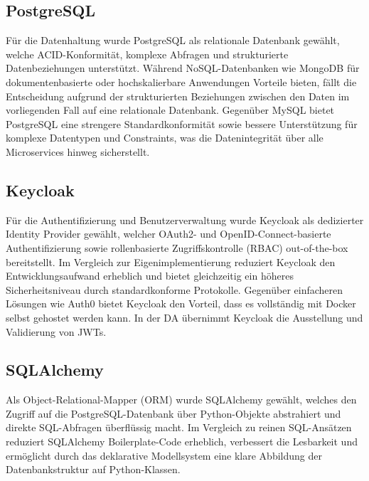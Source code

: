 \newpage

\subsection{PostgreSQL}

Für die Datenhaltung wurde PostgreSQL als relationale Datenbank gewählt, 
welche ACID-Konformität, komplexe Abfragen und strukturierte 
Datenbeziehungen unterstützt.\cite{postgresql}
Während NoSQL-Datenbanken wie MongoDB für dokumentenbasierte oder 
hochskalierbare Anwendungen Vorteile bieten, fällt die Entscheidung aufgrund der strukturierten Beziehungen 
zwischen den Daten im vorliegenden Fall auf eine relationale Datenbank.
Gegenüber MySQL bietet PostgreSQL eine strengere Standardkonformität 
sowie bessere Unterstützung für komplexe Datentypen und Constraints, 
was die Datenintegrität über alle Microservices hinweg sicherstellt.

\subsection{Keycloak}

Für die Authentifizierung und Benutzerverwaltung wurde Keycloak als 
dedizierter Identity Provider gewählt, welcher OAuth2- und 
OpenID-Connect-basierte Authentifizierung sowie rollenbasierte 
Zugriffskontrolle (RBAC) out-of-the-box bereitstellt.\cite{keycloak}
Im Vergleich zur Eigenimplementierung reduziert Keycloak den Entwicklungsaufwand erheblich und bietet 
gleichzeitig ein höheres Sicherheitsniveau durch standardkonforme Protokolle.
Gegenüber einfacheren Lösungen wie Auth0 bietet Keycloak den Vorteil, dass es
vollständig mit Docker selbst gehostet werden kann. 
In der DA übernimmt Keycloak die Ausstellung und Validierung 
von JWTs.

\subsection{SQLAlchemy}

Als Object-Relational-Mapper (ORM) wurde SQLAlchemy gewählt, welches 
den Zugriff auf die PostgreSQL-Datenbank über Python-Objekte abstrahiert 
und direkte \gls{SQL}-Abfragen überflüssig macht.\cite{sqlalchemy}
Im Vergleich zu reinen \gls{SQL}-Ansätzen reduziert SQLAlchemy Boilerplate-Code 
erheblich, verbessert die Lesbarkeit und ermöglicht durch das deklarative 
Modellsystem eine klare Abbildung der Datenbankstruktur auf Python-Klassen.

\newpage

